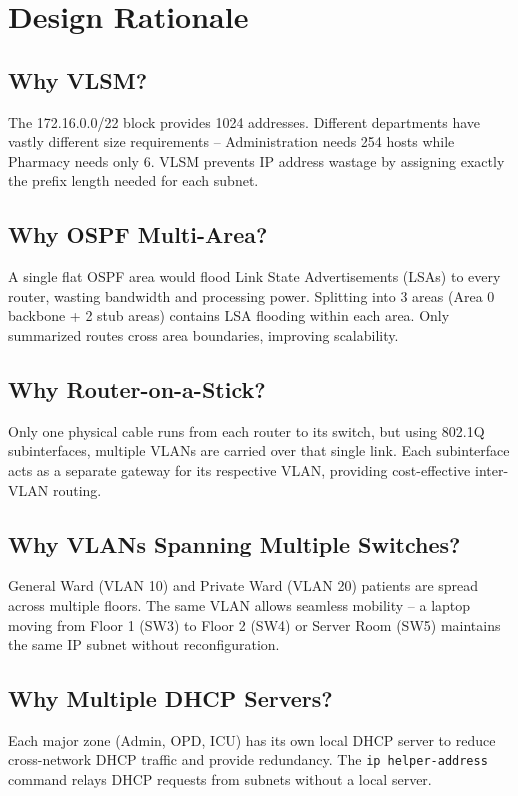 \documentclass[12pt,a4paper]{report}
\begin{document}
\chapter{Design Rationale}

\section{Why VLSM?}
The 172.16.0.0/22 block provides 1024 addresses. Different departments have vastly different size requirements -- Administration needs 254 hosts while Pharmacy needs only 6. VLSM prevents IP address wastage by assigning exactly the prefix length needed for each subnet.

\section{Why OSPF Multi-Area?}
A single flat OSPF area would flood Link State Advertisements (LSAs) to every router, wasting bandwidth and processing power. Splitting into 3 areas (Area 0 backbone + 2 stub areas) contains LSA flooding within each area. Only summarized routes cross area boundaries, improving scalability.

\section{Why Router-on-a-Stick?}
Only one physical cable runs from each router to its switch, but using 802.1Q subinterfaces, multiple VLANs are carried over that single link. Each subinterface acts as a separate gateway for its respective VLAN, providing cost-effective inter-VLAN routing.

\section{Why VLANs Spanning Multiple Switches?}
General Ward (VLAN 10) and Private Ward (VLAN 20) patients are spread across multiple floors. The same VLAN allows seamless mobility -- a laptop moving from Floor 1 (SW3) to Floor 2 (SW4) or Server Room (SW5) maintains the same IP subnet without reconfiguration.

\section{Why Multiple DHCP Servers?}
Each major zone (Admin, OPD, ICU) has its own local DHCP server to reduce cross-network DHCP traffic and provide redundancy. The \texttt{ip helper-address} command relays DHCP requests from subnets without a local server.
\end{document}
